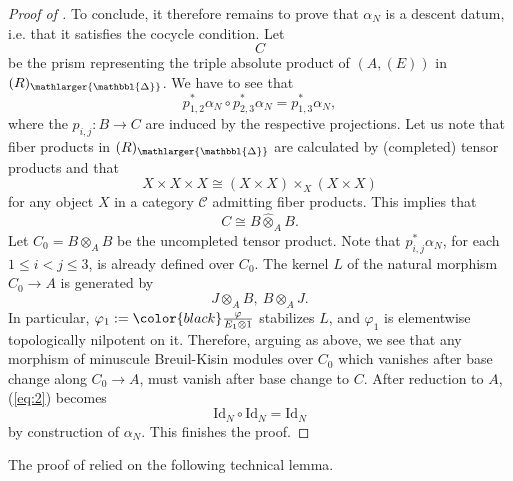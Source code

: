 \documentclass{amsart}
\newcommand{\prism}{{\mathlarger{\mathbbl{\Delta}}}}
\theoremstyle{plain}
\theoremstyle{definition}
\newcommand{\Id}{\textrm{Id}}
\newcommand{\red}[1]{{\color{black} #1}}
\begin{document}
\begin{proof}[Proof of ]
To conclude, it therefore remains to prove that $\alpha_N$ is a descent datum, i.e. that it satisfies the cocycle condition.
Let
  \[
    C
  \] be the prism representing the triple absolute product of $(A,(E))$ in $(R)_{\prism}$. We have to see that
  \begin{equation}
    \label{eq:2}
    p^\ast_{1,2}\alpha_N\circ p^\ast_{2,3}\alpha_N=p^\ast_{1,3}\alpha_N,
  \end{equation}
  where the $p_{i,j}\colon B\to C$ are induced by the respective projections. Let us note that fiber products in $(R)_\prism$ are calculated by (completed) tensor products and that
  \[
    X\times X\times X\cong (X\times X)\times_{X} (X\times X)
  \]
  for any object $X$ in a category $\mathcal{C}$ admitting fiber products.
  This implies that
   \[
     C\cong B\widehat{\otimes}_A B.
\]
Let $C_0= B\otimes_A B$ be the uncompleted tensor product. Note that $p^\ast_{i,j}\alpha_N$, for each $1\leq i<j\leq 3$, is already defined over $C_0$. The kernel $L$ of the natural morphism $C_0 \to A$ is generated by
    \[
     J\otimes_A B, ~ B\otimes_A J.
   \]
  In particular, $\varphi_1:=\red{\frac{\varphi}{E_1\otimes 1}}$ stabilizes $L$, and $\varphi_1$ is elementwise topologically nilpotent on it. Therefore, arguing as above, we see that any morphism of minuscule Breuil-Kisin modules over $C_0$ which vanishes after base change along $C_0 \to A$, must vanish after base change to $C$. After reduction to $A$, (\ref{eq:2}) becomes
   \[
     \Id_N\circ \Id_N=\Id_N
   \]
   by construction of $\alpha_N$. This finishes the proof. 
\end{proof}


The proof of  relied on the following technical lemma.
\end{document}
